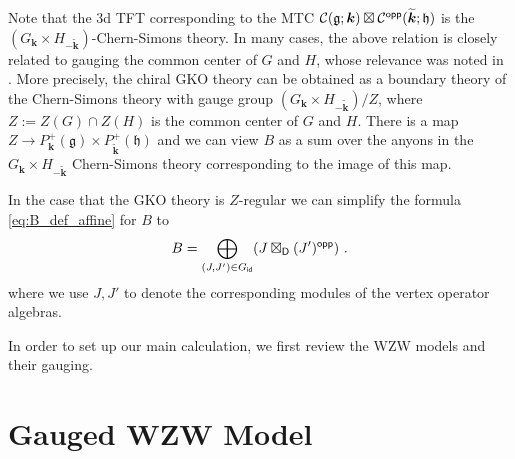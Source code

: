 \documentclass[a4paper,11pt]{article}
\newcommand{\bk}{\bm{k}}
\newcommand{\tsf}[1]{\textsf{#1}}
\newcommand{\wt}[1]{\widetilde{#1}}
\def\be{ \begin{equation} }
\def\ee{ \end{equation}}
\def\CC {{\cal C}}
\def\fg{\mathfrak{g}}
\def\fh{\mathfrak{h}}
\def\rem{$\clubsuit$}
\newcommand{\cg}[1]{\marginpar{\raggedright \tiny \rem #1 \rem}} %
\begin{document}
\par Note that the 3d \tsf{TFT} corresponding to the \tsf{MTC} $\CC(\fg;\bk)\boxtimes\CC^{\mr{opp}}(\wt\bk;\fh)$ is the $(G_{\bk}\times H_{-\wt{\bk}})$-Chern-Simons theory.
In many cases, the above relation is closely related to   gauging the common center of $G$ and $H$, whose relevance was noted in \cite{Moore:1989yh}. More precisely, the chiral \tsf{GKO} theory can be obtained as a boundary theory of the Chern-Simons theory with gauge group $(G_{\bk}\times H_{-\wt{\bk}})/Z$, where $Z:=Z(G)\cap Z(H)$ is the common center of $G$ and $H$. There is a map 
$Z \to P^+_{\bk}(\fg) \times P_{\wt\bk}^+(\fh)$ and we can view $B$ as a sum over the   anyons in the $G_{\bk}\times H_{-\wt{\bk}}$ Chern-Simons theory corresponding to the image of this map. 

In the case that the \tsf{GKO} theory is $Z$-regular we can simplify the formula \eqref{eq:B_def_affine} for $B$ to 
%
\be\label{eq:SimpleB}
B = \bigoplus_{(J,J')\in G_{\mr{id}}}  (J \boxtimes_{\mr{D}} (J')^{\mr{opp}})~. 
\ee
%
where we use $J,J'$ to denote the corresponding modules of the vertex operator algebras. 

%
%
%


In order to set up our main calculation, we first review the  \tsf{WZW} models and their gauging.  



\section{Gauged \tsf{WZW} Model}\label{sec:WZW_review}
\end{document}
